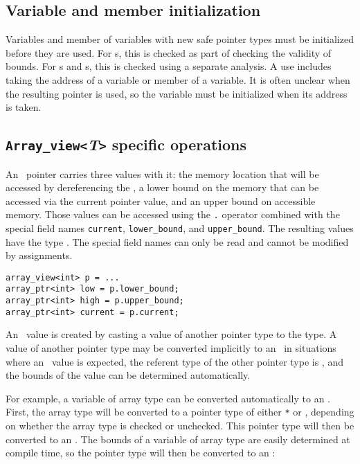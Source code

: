 \subsection{Variable and member initialization}

Variables and member of variables with new safe pointer types must be initialized
before they are used.  For \arrayptr s, this is checked as part of checking
the validity of bounds.  For \ptr s and \arrayview s, this is checked
using a separate analysis.   A use includes taking the address of a variable
or member of a variable.  It is often unclear when the resulting pointer is used,
so the variable must be initialized when its address is taken.

\subsection{\texttt{Array\_view<}\textit{T}\texttt{>} specific operations}

An \arrayviewT\
pointer carries three values with it: the memory location that will be
accessed by dereferencing the
\arrayviewT, a lower
bound on the memory that can be accessed via the current pointer value,
and an upper bound on accessible memory. Those values can be accessed
using the \texttt{.} operator combined with the special field names
\texttt{current}, \texttt{lower\_bound}, and \texttt{upper\_bound}. The
resulting values have the type
\arrayptrT. The
special field names can only be read and cannot be modified by
assignments.

\begin{verbatim}
array_view<int> p = ...
array_ptr<int> low = p.lower_bound;
array_ptr<int> high = p.upper_bound;
array_ptr<int> current = p.current;
\end{verbatim}

An \arrayviewT\ value
is created by casting a value of another pointer type to the
\arrayviewT type. A
value of another pointer type may be converted implicitly to an
\arrayviewT\ in
situations where an
\arrayviewT\ value is
expected, the referent type of the other pointer type is , and
the bounds of the value can be determined automatically.

For example, a variable of array type can be converted automatically to
an \arrayview. First, the array type will be converted to a
pointer type of either  \texttt{*} or
\arrayptrT , depending
on whether the array type is checked or unchecked. This pointer type
will then be converted to an
\arrayviewT. The
bounds of a variable of array type are easily determined at compile
time, so the pointer type will then be converted to an
\arrayviewT:

